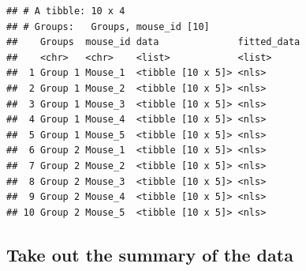 \documentclass[
]{book}
\newenvironment{Shaded}{\begin{snugshade}}{\end{snugshade}}
\newcommand{\AttributeTok}[1]{\textcolor[rgb]{0.77,0.63,0.00}{#1}}
\newcommand{\CommentTok}[1]{\textcolor[rgb]{0.56,0.35,0.01}{\textit{#1}}}
\newcommand{\FunctionTok}[1]{\textcolor[rgb]{0.00,0.00,0.00}{#1}}
\newcommand{\NormalTok}[1]{#1}
\newcommand{\OtherTok}[1]{\textcolor[rgb]{0.56,0.35,0.01}{#1}}
\newcommand{\SpecialCharTok}[1]{\textcolor[rgb]{0.00,0.00,0.00}{#1}}
\begin{document}
\begin{verbatim}
## # A tibble: 10 x 4
## # Groups:   Groups, mouse_id [10]
##    Groups  mouse_id data              fitted_data
##    <chr>   <chr>    <list>            <list>     
##  1 Group 1 Mouse_1  <tibble [10 x 5]> <nls>      
##  2 Group 1 Mouse_2  <tibble [10 x 5]> <nls>      
##  3 Group 1 Mouse_3  <tibble [10 x 5]> <nls>      
##  4 Group 1 Mouse_4  <tibble [10 x 5]> <nls>      
##  5 Group 1 Mouse_5  <tibble [10 x 5]> <nls>      
##  6 Group 2 Mouse_1  <tibble [10 x 5]> <nls>      
##  7 Group 2 Mouse_2  <tibble [10 x 5]> <nls>      
##  8 Group 2 Mouse_3  <tibble [10 x 5]> <nls>      
##  9 Group 2 Mouse_4  <tibble [10 x 5]> <nls>      
## 10 Group 2 Mouse_5  <tibble [10 x 5]> <nls>
\end{verbatim}

\hypertarget{take-out-the-summary-of-the-data}{%
\subsection{Take out the summary of the data}\label{take-out-the-summary-of-the-data}}

\begin{Shaded}
\end{Shaded}
\end{document}

